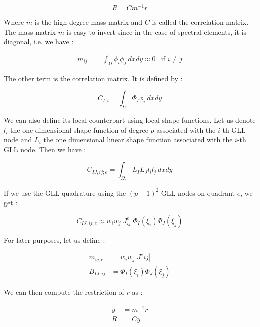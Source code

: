 $$ R = Cm^{-1}r$$ 

Where $m$ is the high degree mass matrix and $C$ is called the correlation matrix. The mass matrix $m$ is easy to invert since in the case of spectral elements, it is diagonal, i.e. we have :

\begin{align*}
m_{ij} &= \int_\Omega \phi_i\phi_j \: dxdy \approx 0  &\text{if $i\neq j$}
\end{align*}


The other term is the correlation matrix. It is defined by : 

$$ C_{I,i} = \int_\Omega \Phi_I\phi_i \: dxdy$$

We can also define its local counterpart using local shape functions. Let us denote $l_i$ the one dimensional shape function of degree $p$ associated with the $i$-th GLL node and $L_i$ the one dimensional linear shape function associated with the $i$-th GLL node. Then we have :

$$ C_{IJ,ij;e} = \int_{\Omega_e} L_IL_J l_il_j \: dxdy$$

If we use the GLL quadrature using the $(p+1)^2$ GLL nodes on quadrant $e$, we get : 

$$C_{IJ,ij;e} \approx w_iw_j|J^e_{ij}| \Phi_I(\xi_i)\Phi_J(\xi_j)$$

For later purposes, let us define : 

\begin{align*}
m_{ij;e} &= w_iw_j|J^e{ij}|\\
B_{IJ,ij} &= \Phi_I(\xi_i)\Phi_J(\xi_j)
\end{align*}

We can then compute the restriction of $r$ as : 

\begin{align*}
y &= m^{-1}r\\
R &= Cy
\end{align*}


